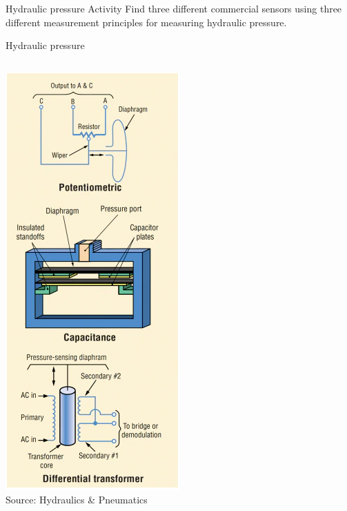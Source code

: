 \documentclass[presentation,aspectratio=169]{beamer}
\begin{document}
\begin{frame}[label={sec:org833ec48}]{Hydraulic pressure}
\alert{Activity} Find three different commercial sensors using three different measurement principles for measuring hydraulic pressure. 
\end{frame}

\begin{frame}[label={sec:orgb605a39}]{Hydraulic pressure}
\begin{columns}
\begin{column}{0.3\columnwidth}

\begin{center}
\includegraphics[width=0.64\linewidth]{../../figures/pressure-sensor.png}\\
{\tiny Source:  Hydraulics \& Pneumatics}
\end{center}
\end{column}


\end{columns}
\end{frame}
\end{document}
